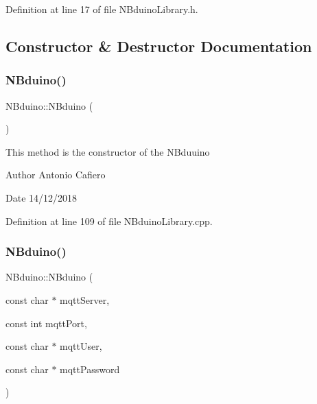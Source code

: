Definition at line 17 of file N\+Bduino\+Library.\+h.



\subsection{Constructor \& Destructor Documentation}
\mbox{\label{class_n_bduino_acd7c1c69bffccefc807ff89394732a7d}} 
\subsubsection{\texorpdfstring{N\+Bduino()}{NBduino()}\hspace{0.1cm}{\footnotesize\ttfamily [1/3]}}
{\footnotesize\ttfamily N\+Bduino\+::\+N\+Bduino (\begin{DoxyParamCaption}{ }\end{DoxyParamCaption})}

This method is the constructor of the N\+Bduuino \begin{DoxyAuthor}{Author}
Antonio Cafiero 
\end{DoxyAuthor}
\begin{DoxyDate}{Date}
14/12/2018 
\end{DoxyDate}


Definition at line 109 of file N\+Bduino\+Library.\+cpp.

\mbox{\label{class_n_bduino_a33e6b13bdee69684a051f00a1a15ddd1}} 
\subsubsection{\texorpdfstring{N\+Bduino()}{NBduino()}\hspace{0.1cm}{\footnotesize\ttfamily [2/3]}}
{\footnotesize\ttfamily N\+Bduino\+::\+N\+Bduino (\begin{DoxyParamCaption}\item[{const char $\ast$}]{mqtt\+Server,  }\item[{const int}]{mqtt\+Port,  }\item[{const char $\ast$}]{mqtt\+User,  }\item[{const char $\ast$}]{mqtt\+Password }\end{DoxyParamCaption})}

